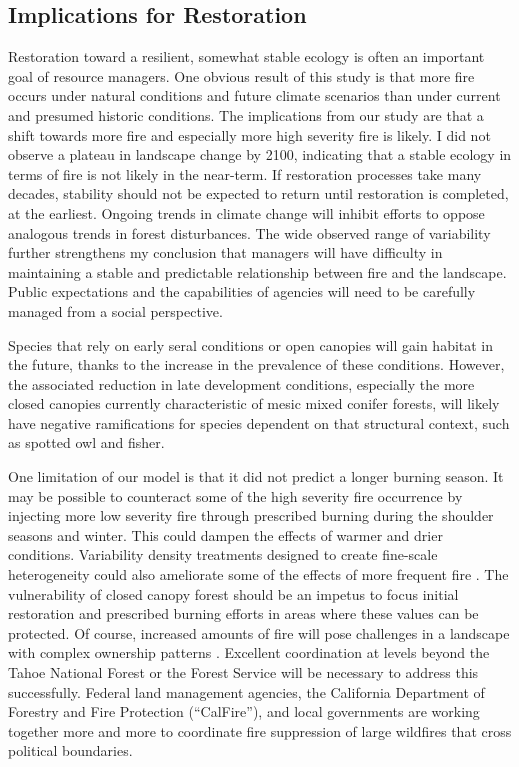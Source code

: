 \subsection{Implications for Restoration}

Restoration toward a resilient, somewhat stable ecology is often an important goal of resource managers. One obvious result of this study is that more fire occurs under natural conditions and future climate scenarios than under current and presumed historic conditions. The implications from our study are that a shift towards more fire and especially more high severity fire is likely. I did not observe a plateau in landscape change by 2100, indicating that a stable ecology in terms of fire is not likely in the near-term. If restoration processes take many decades, stability should not be expected to return until restoration is completed, at the earliest. Ongoing trends in climate change will inhibit efforts to oppose analogous trends in forest disturbances. The wide observed range of variability further strengthens my conclusion that managers will have difficulty in maintaining a stable and predictable relationship between fire and the landscape. Public expectations and the capabilities of agencies will need to be carefully managed from a social perspective.

Species that rely on early seral conditions or open canopies will gain habitat in the future, thanks to the increase in the prevalence of these conditions. However, the associated reduction in late development conditions, especially the more closed canopies currently characteristic of mesic mixed conifer forests, will likely have negative ramifications for species dependent on that structural context, such as spotted owl and fisher.

One limitation of our model is that it did not predict a longer burning season. It may be possible to counteract some of the high severity fire occurrence by injecting more low severity fire through prescribed burning during the shoulder seasons and winter. This could dampen the effects of warmer and drier conditions. Variability density treatments designed to create fine-scale heterogeneity could also ameliorate some of the effects of more frequent fire \citep{Stephens2010,Knapp2012,North2012a}. The vulnerability of closed canopy forest should be an impetus to focus initial restoration and prescribed burning efforts in areas where these values can be protected. Of course, increased amounts of fire will pose challenges in a landscape with complex ownership patterns \citep{Stephens2013}. Excellent coordination at levels beyond the Tahoe National Forest or the Forest Service will be necessary to address this successfully. Federal land management agencies, the California Department of Forestry and Fire Protection (``CalFire''), and local governments are working together more and more to coordinate fire suppression of large wildfires that cross political boundaries.

